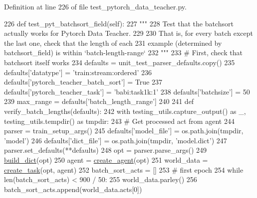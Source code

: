 Definition at line 226 of file test\+\_\+pytorch\+\_\+data\+\_\+teacher.\+py.


\begin{DoxyCode}
226     \textcolor{keyword}{def }test\_pyt\_batchsort\_field(self):
227         \textcolor{stringliteral}{"""}
228 \textcolor{stringliteral}{        Test that the batchsort actually works for Pytorch Data Teacher.}
229 \textcolor{stringliteral}{}
230 \textcolor{stringliteral}{        That is, for every batch except the last one, check that the length of each}
231 \textcolor{stringliteral}{        example (determined by batchsort\_field) is within `batch-length-range`}
232 \textcolor{stringliteral}{        """}
233         \textcolor{comment}{# First, check that batchsort itself works}
234         defaults = unit\_test\_parser\_defaults.copy()
235         defaults[\textcolor{stringliteral}{'datatype'}] = \textcolor{stringliteral}{'train:stream:ordered'}
236         defaults[\textcolor{stringliteral}{'pytorch\_teacher\_batch\_sort'}] = \textcolor{keyword}{True}
237         defaults[\textcolor{stringliteral}{'pytorch\_teacher\_task'}] = \textcolor{stringliteral}{'babi:task1k:1'}
238         defaults[\textcolor{stringliteral}{'batchsize'}] = 50
239         max\_range = defaults[\textcolor{stringliteral}{'batch\_length\_range'}]
240 
241         \textcolor{keyword}{def }verify\_batch\_lengths(defaults):
242             with testing\_utils.capture\_output() \textcolor{keyword}{as} \_, testing\_utils.tempdir() \textcolor{keyword}{as} tmpdir:
243                 \textcolor{comment}{# Get processed act from agent}
244                 parser = train\_setup\_args()
245                 defaults[\textcolor{stringliteral}{'model\_file'}] = os.path.join(tmpdir, \textcolor{stringliteral}{'model'})
246                 defaults[\textcolor{stringliteral}{'dict\_file'}] = os.path.join(tmpdir, \textcolor{stringliteral}{'model.dict'})
247                 parser.set\_defaults(**defaults)
248                 opt = parser.parse\_args()
249                 \hyperlink{namespacebuild__dict}{build\_dict}(opt)
250                 agent = \hyperlink{namespaceparlai_1_1core_1_1agents_a00d77a7e26fb89e8bd900f7b2a02982a}{create\_agent}(opt)
251                 world\_data = \hyperlink{namespaceparlai_1_1core_1_1worlds_a79969c7ba76d4b3c500f5bb776444dc6}{create\_task}(opt, agent)
252                 batch\_sort\_acts = []
253                 \textcolor{comment}{# first epoch}
254                 \textcolor{keywordflow}{while} len(batch\_sort\_acts) < 900 / 50:
255                     world\_data.parley()
256                     batch\_sort\_acts.append(world\_data.acts[0])

\end{DoxyCode}
